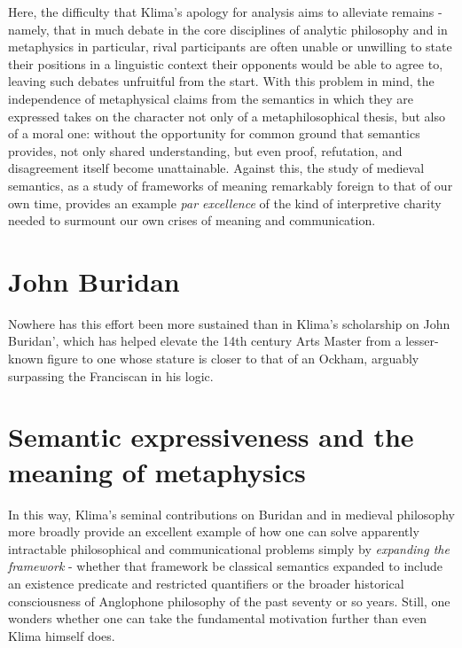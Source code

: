 \documentclass[]{article}
\begin{document}
Here, the difficulty that Klima's apology for analysis aims to alleviate remains - 
namely, that in much debate in the core disciplines of analytic philosophy  
and in metaphysics in particular, 
rival participants are often unable or unwilling to state their positions in a linguistic context their opponents would be able to agree to, 
leaving such debates unfruitful from the start. 
With this problem in mind, 
the independence of metaphysical claims from the semantics in which they are expressed takes on the character not only of a metaphilosophical thesis, 
but also of a moral one: 
without the opportunity for common ground that semantics provides, 
not only shared understanding, 
but even proof, refutation, 
and disagreement itself become unattainable.
Against this, 
the study of medieval semantics, 
as a study of frameworks of meaning remarkably foreign to that of our own time, 
provides an example \emph{par excellence} of the kind of interpretive charity needed to surmount our own crises of meaning and communication. 

\section{John Buridan}
Nowhere has this effort been more sustained than in Klima's scholarship on John Buridan', 
which has helped elevate the 14th century Arts Master from a lesser-known figure to one whose stature is closer to that of an Ockham, 
arguably surpassing the Franciscan in his logic.

\section{Semantic expressiveness and the meaning of metaphysics}
In this way, 
Klima's seminal contributions on Buridan and in medieval philosophy more broadly provide an excellent example of how one can solve apparently intractable philosophical and communicational problems 
simply by \emph{expanding the framework}
 - whether that framework be classical semantics expanded to include an existence predicate and restricted quantifiers
 or the broader historical consciousness of Anglophone philosophy of the past seventy or so years. 
Still, one wonders whether one can take the fundamental motivation further than even Klima himself does. 
\end{document}
